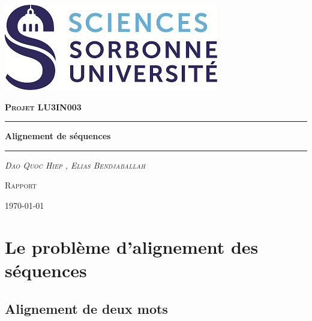 \documentclass[12pt, a4paper]{report}
\author{Elias Bendjaballah}
\date{today's date}
\begin{document}
\begin{titlepage}

\centering
\includegraphics[scale=0.75]{logo2.png}
\par\vspace{1cm}
\vspace{1cm}
{\scshape\large\textbf{Projet LU3IN003} \par}
\vspace{1.5cm}
\rule{\linewidth}{0.2 mm}
{\huge\bfseries Alignement de séquences \par}
\rule{\linewidth}{0.2 mm}
\par\vspace{2cm}
{\scshape\large\itshape  Dao Quoc Hiep , Elias Bendjaballah \par}
\vfill
\large\textsc{Rapport}
\vfill
{\large \today\par}

\end{titlepage}

\tableofcontents
\pagebreak

\renewcommand{\thesection}{\arabic{section}}
\section{Le problème d'alignement des séquences}
\subsection{Alignement de deux mots}
\end{document}
